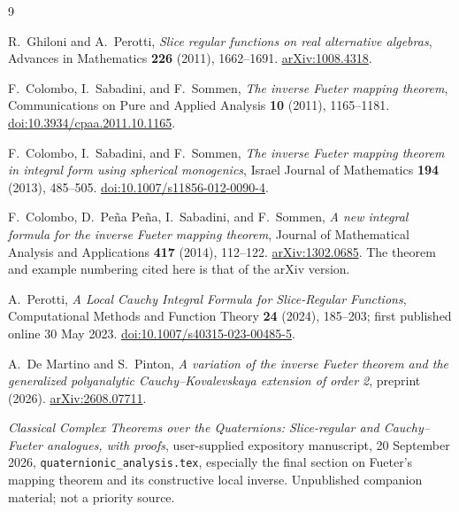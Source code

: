 \documentclass[11pt,a4paper]{article}
\numberwithin{equation}{section}
\theoremstyle{definition}
\theoremstyle{remark}
\begin{document}
\begin{thebibliography}{9}

R.~Ghiloni and A.~Perotti,
\emph{Slice regular functions on real alternative algebras},
Advances in Mathematics \textbf{226} (2011), 1662--1691.
\href{https://arxiv.org/abs/1008.4318}{arXiv:1008.4318}.

F.~Colombo, I.~Sabadini, and F.~Sommen,
\emph{The inverse Fueter mapping theorem},
Communications on Pure and Applied Analysis \textbf{10} (2011), 1165--1181.
\href{https://doi.org/10.3934/cpaa.2011.10.1165}{doi:10.3934/cpaa.2011.10.1165}.

F.~Colombo, I.~Sabadini, and F.~Sommen,
\emph{The inverse Fueter mapping theorem in integral form using spherical
monogenics}, Israel Journal of Mathematics \textbf{194} (2013), 485--505.
\href{https://doi.org/10.1007/s11856-012-0090-4}{doi:10.1007/s11856-012-0090-4}.

F.~Colombo, D.~Pe\~na Pe\~na, I.~Sabadini, and F.~Sommen,
\emph{A new integral formula for the inverse Fueter mapping theorem},
Journal of Mathematical Analysis and Applications \textbf{417} (2014),
112--122. \href{https://arxiv.org/abs/1302.0685}{arXiv:1302.0685}.
The theorem and example numbering cited here is that of the arXiv version.

A.~Perotti,
\emph{A Local Cauchy Integral Formula for Slice-Regular Functions},
Computational Methods and Function Theory \textbf{24} (2024), 185--203;
first published online 30 May 2023.
\href{https://doi.org/10.1007/s40315-023-00485-5}{doi:10.1007/s40315-023-00485-5}.

A.~De Martino and S.~Pinton,
\emph{A variation of the inverse Fueter theorem and the generalized
polyanalytic Cauchy--Kovalevskaya extension of order 2},
preprint (2026).
\href{https://arxiv.org/abs/2608.07711}{arXiv:2608.07711}.

{\raggedright
\emph{Classical Complex Theorems over the Quaternions:
Slice-regular and Cauchy--Fueter analogues, with proofs},
user-supplied expository manuscript, 20 September 2026,
\texttt{quaternionic\_analysis.tex}, especially the final section on
Fueter's mapping theorem and its constructive local inverse.
Unpublished companion material; not a priority source.\par}

\end{thebibliography}
\end{document}
